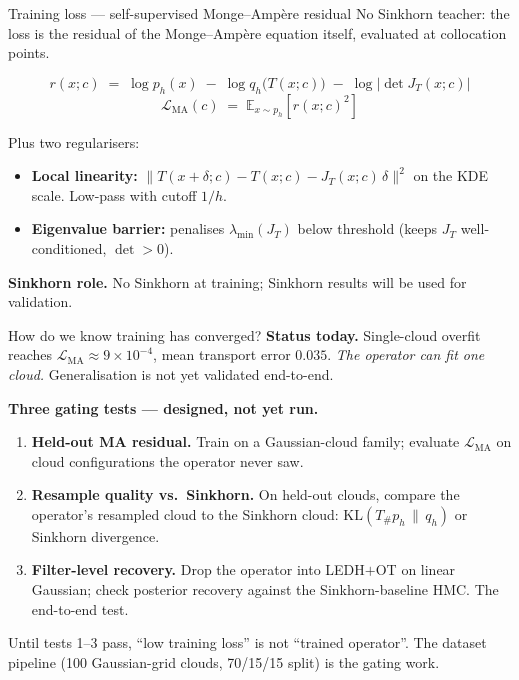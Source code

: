 \documentclass[10pt,aspectratio=169]{beamer}
\newcommand{\E}{\mathbb{E}}
\begin{document}
\begin{frame}{Training loss --- self-supervised Monge--Amp\`ere residual}
  No Sinkhorn teacher: the loss is the residual of the Monge--Amp\`ere equation itself, evaluated at collocation points.

  \medskip
  \[
    r(x;c) \;=\; \log p_h(x) \;-\; \log q_h\!\big(T(x;c)\big) \;-\; \log\big|\det J_T(x;c)\big|
  \]
  \[
    \mathcal{L}_\text{MA}(c) \;=\; \E_{x \sim p_h}\!\left[r(x;c)^2\right]
  \]

  \medskip
  Plus two regularisers:
  \begin{itemize}\setlength{\itemsep}{0.2em}
    \item \textbf{Local linearity:} $\|T(x{+}\delta;c) - T(x;c) - J_T(x;c)\,\delta\|^2$ on the KDE scale. Low-pass with cutoff $1/h$.
    \item \textbf{Eigenvalue barrier:} penalises $\lambda_\text{min}(J_T)$ below threshold (keeps $J_T$ well-conditioned, $\det > 0$).
  \end{itemize}

  \medskip
  \textbf{Sinkhorn role.} No Sinkhorn at training; Sinkhorn results will be used for validation.
\end{frame}

\begin{frame}{How do we know training has converged?}
  \textbf{Status today.} Single-cloud overfit reaches $\mathcal{L}_\text{MA} \approx 9\times 10^{-4}$, mean transport error $0.035$. \emph{The operator can fit one cloud.} Generalisation is not yet validated end-to-end.

  \medskip
  \textbf{Three gating tests --- designed, not yet run.}
  \begin{enumerate}\setlength{\itemsep}{0.2em}
    \item \textbf{Held-out MA residual.} Train on a Gaussian-cloud family; evaluate $\mathcal{L}_\text{MA}$ on cloud configurations the operator never saw.
    \item \textbf{Resample quality vs.\ Sinkhorn.} On held-out clouds, compare the operator's resampled cloud to the Sinkhorn cloud: $\mathrm{KL}(T_\# p_h \,\|\, q_h)$ or Sinkhorn divergence.
    \item \textbf{Filter-level recovery.} Drop the operator into LEDH$+$OT on linear Gaussian; check posterior recovery against the Sinkhorn-baseline HMC. The end-to-end test.
  \end{enumerate}

  \medskip
  Until tests 1--3 pass, ``low training loss'' is not ``trained operator''. The dataset pipeline (100 Gaussian-grid clouds, 70/15/15 split) is the gating work.
\end{frame}
\end{document}
